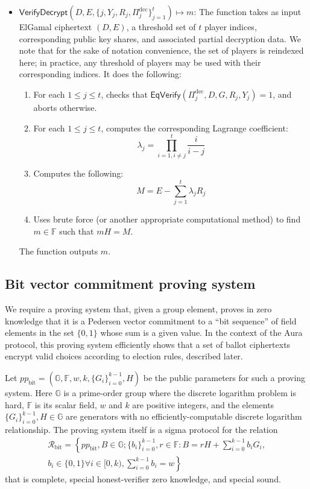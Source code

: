 \documentclass{article}
\newcommand{\G}{\mathbb{G}}
\newcommand{\F}{\mathbb{F}}
\newcommand{\func}[1]{\mathsf{#1}}
\begin{document}
\begin{itemize}
    \item $\func{VerifyDecrypt}(D, E, \{j, Y_j, R_j, \Pi_j^{\text{dec}}\}_{j=1}^t) \mapsto m$: The function takes as input ElGamal ciphertext $(D, E)$, a threshold set of $t$ player indices, corresponding public key shares, and associated partial decryption data.
    We note that for the sake of notation convenience, the set of players is reindexed here; in practice, any threshold of players may be used with their corresponding indices.
    It does the following:
    \begin{enumerate}
        \item For each $1 \leq j \leq t$, checks that $\func{EqVerify}(\Pi_j^{\text{dec}}, D, G, R_j, Y_j) = 1$, and aborts otherwise.
        \item For each $1 \leq j \leq t$, computes the corresponding Lagrange coefficient: $$\lambda_j = \prod_{i=1, i \neq j}^t \frac{i}{i - j}$$
        \item Computes the following: $$M = E - \sum_{j=1}^t \lambda_j R_j$$
        \item Uses brute force (or another appropriate computational method) to find $m \in \F$ such that $mH = M$.
    \end{enumerate}
    The function outputs $m$.
\end{itemize}


\subsection{Bit vector commitment proving system}

We require a proving system that, given a group element, proves in zero knowledge that it is a Pedersen vector commitment to a ``bit sequence'' of field elements in the set $\{0,1\}$ whose sum is a given value.
In the context of the Aura protocol, this proving system efficiently shows that a set of ballot ciphertexts encrypt valid choices according to election rules, described later.

Let $pp_{\text{bit}} = \left( \G, \F, w, k, \{G_i\}_{i=0}^{k-1}, H \right)$ be the public parameters for such a proving system.
Here $\G$ is a prime-order group where the discrete logarithm problem is hard, $\F$ is its scalar field, $w$ and $k$ are positive integers, and the elements $\{G_i\}_{i=0}^{k-1}, H \in \G$ are generators with no efficiently-computable discrete logarithm relationship.
The proving system itself is a sigma protocol for the relation
\begin{multline*}
\mathcal{R}_{\text{bit}} = \left\{ pp_{\text{bit}}, B \in \G ; \{b_i\}_{i=0}^{k-1}, r \in \F : B = rH + \sum_{i=0}^{k-1} b_i G_i, \right. \\
\left. b_i \in \{0,1\} \forall i \in [0,k), \sum_{i=0}^{k-1} b_i = w \right\}
\end{multline*}
that is complete, special honest-verifier zero knowledge, and special sound.
\end{document}
